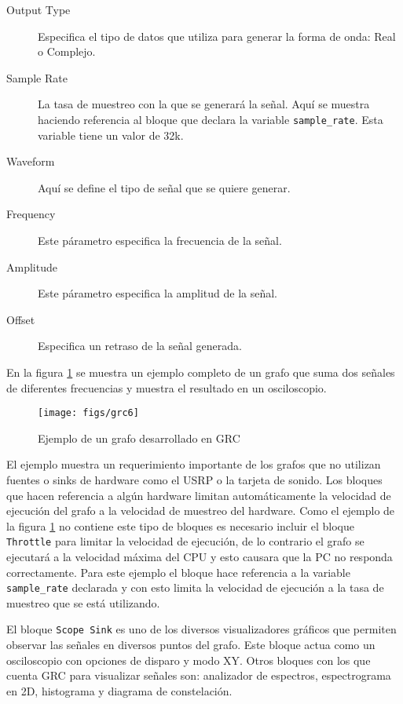 \begin{description}
\item[Output Type] Especifica el tipo de datos que utiliza para generar la forma de onda: Real o Complejo.
\item[Sample Rate] La tasa de muestreo con la que se generar\'a la se\~nal. Aqu\'i se muestra haciendo
referencia al bloque que declara la variable \verb|sample_rate|. Esta variable tiene un valor de
32k.
\item[Waveform] Aqu\'i se define el tipo de se\~nal que se quiere generar.
\item[Frequency] Este p\'arametro especifica la frecuencia de la se\~nal.
\item[Amplitude] Este p\'arametro especifica la amplitud de la se\~nal.
\item[Offset] Especifica un retraso de la se\~nal generada.
\end{description}

En la figura \ref{fig:grcex} se muestra un ejemplo completo de un grafo que suma dos se\~nales de
diferentes frecuencias y muestra el resultado en un osciloscopio.

\begin{figure}[tp]
  \centering
  \texttt{[image: figs/grc6]}
  \vspace{0.1in}
  \caption{Ejemplo de un grafo desarrollado en GRC}
  \label{fig:grcex}
\end{figure}

El ejemplo muestra un requerimiento importante de los grafos que no utilizan fuentes o sinks de
hardware como el USRP o la tarjeta de sonido. Los bloques que hacen referencia a alg\'un hardware
limitan autom\'aticamente la velocidad de ejecuci\'on del grafo a la velocidad de muestreo del
hardware. Como el ejemplo de la figura \ref{fig:grcex} no contiene este tipo de bloques es
necesario incluir el bloque \verb|Throttle| para limitar la velocidad de ejecuci\'on, de lo
contrario el grafo se ejecutar\'a a la velocidad m\'axima del CPU y esto causara que la PC no
responda correctamente. Para este ejemplo el bloque hace referencia a la variable \verb|sample_rate|
declarada y con esto limita la velocidad de ejecuci\'on a la tasa de muestreo que se est\'a utilizando.

El bloque \verb|Scope Sink| es uno de los diversos visualizadores gr\'aficos que permiten observar las
se\~nales en diversos puntos del grafo. Este bloque actua como un osciloscopio con opciones de
disparo y modo XY. Otros bloques con los que cuenta GRC para visualizar se\~nales son: analizador de
espectros, espectrograma en 2D, histograma y diagrama de constelaci\'on.

